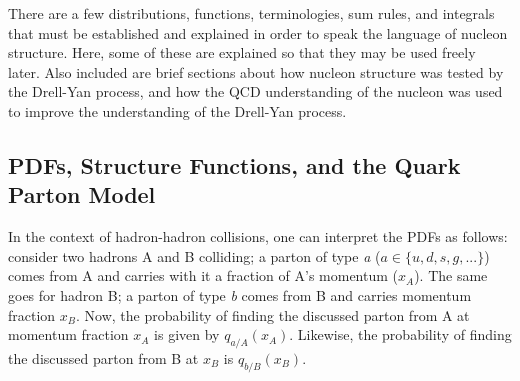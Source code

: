 There are a few distributions, functions, terminologies, sum rules, and integrals that must be established and explained in order to speak the language of nucleon structure. Here, some of these are explained so that they may be used freely later. Also included are brief sections about how nucleon structure was tested by the Drell-Yan process, and how the QCD understanding of the nucleon was used to improve the understanding of the Drell-Yan process.

\subsection{PDFs, Structure Functions, and the Quark Parton Model}\label{sec:pdf}

In the context of hadron-hadron collisions, one can interpret the PDFs as follows: consider two hadrons A and B colliding; a parton of type \emph{a} ($a\in \{u, d, s, g, ...\}$) comes from A and carries with it a fraction of A's momentum ($x_A$).  The same goes for hadron B; a parton of type \emph{b} comes from B and carries momentum fraction $x_B$. Now, the probability of finding the discussed parton from A at momentum fraction $x_A$ is given by $q_{a/A}(x_A)$. Likewise, the probability of finding the discussed parton from B at $x_B$ is $q_{b/B}(x_B)$.

